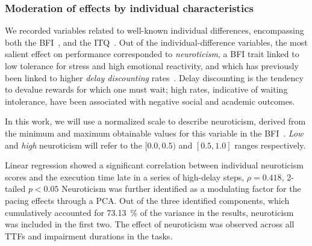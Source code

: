 \subsubsection{Moderation of effects by individual characteristics}\label{ssec:moderationeffects}

We recorded variables related to well-known individual differences, encompassing both the \acf{BFI}~\cite{oliver:bfi1999}, and the \acf{ITQ}~\cite{witmer1998measuring}.
Out of the individual-difference variables, the most salient effect on performance corresponded to \emph{neuroticism}, a \gls{BFI} trait linked to low tolerance for stress and high emotional reactivity, and which has previously been linked to higher \emph{delay discounting} rates~\cite{hirsh2008delay}.
Delay discounting is the tendency to devalue rewards for which one must wait; high rates, indicative of waiting intolerance, have been associated with negative social and academic outcomes.


In this work, we will use a normalized scale to describe neuroticism, derived from the minimum and maximum obtainable values for this variable in the \gls{BFI}~\cite{oliver:bfi1999}.
\emph{Low} and \emph{high} neuroticism will refer to the \( [0.0, 0.5) \) and \( [0.5, 1.0] \) ranges respectively.

Linear regression showed a significant correlation between individual neuroticism scores and the execution time late in a series of high-delay steps, \( \rho = 0.418 \), \num{2}-tailed \( p < 0.05 \)
Neuroticism was further identified as a modulating factor for the pacing effects through a \gls{PCA}.
Out of the three identified components, which cumulatively accounted for \SI{73.13}{\percent} of the variance in the results, neuroticism was included in the first two.
The effect of neuroticism was observed across all \acp{TTF} and impairment durations in the tasks.  


